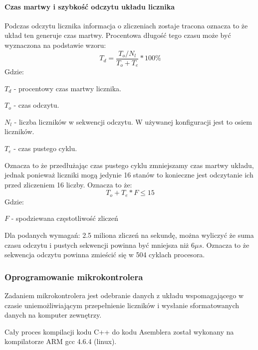 \paragraph{Czas martwy i szybkość odczytu układu licznika}

Podczas odczytu licznika informacja o zliczeniach zostaje tracona oznacza to że układ ten generuje czas martwy. 
Procentowa długość tego czasu może być wyznaczona na podstawie wzoru:
\begin{equation}
        T_d = \frac{T_o/N_l}{T_o+T_e} * 100\%
\end{equation}
Gdzie:
\begin{description}
        \item $T_d$ - procentowy czas martwy licznika.
        \item $T_o$ - czas odczytu.
        \item $N_l$ - liczba liczników w sekwencji odczytu. W używanej konfiguracji jest to osiem liczników. 
        \item $T_e$ - czas pustego cyklu.
\end{description}

Oznacza to że przedłużając czas pustego cyklu zmniejszamy czas martwy układu, jednak ponieważ liczniki mogą jedynie 16 stanów to konieczne jest odczytanie ich przed zliczeniem 16 liczby. 
Oznacza to że:
\begin{equation}
        T_o+T_e * F \leqslant 15
\end{equation}
        Gdzie:
\begin{description}
        \item $F$ - spodziewana częstotliwość zliczeń
\end{description}

Dla podanych wymagań: 2.5 miliona zliczeń na sekundę, można wyliczyć że suma czasu odczytu i pustych sekwencji powinna być mniejsza niż 6$\mu s$.
Oznacza to że sekwencja odczytu powinna zmieścić się w 504 cyklach procesora. 

\subsubsection{Oprogramowanie mikrokontrolera}
\label{oprogramowanie mikrokontrolera}

Zadaniem mikrokontrolera jest odebranie danych z układu wspomagającego w czasie uniemożliwiającym przepełnienie liczników i wysłanie sformatowanych danych na komputer zewnętrzy. 

Cały proces kompilacji kodu C++ do kodu Asemblera został wykonany na kompilatorze ARM gcc 4.6.4 (linux). 

